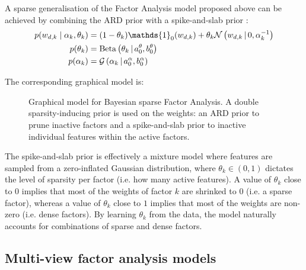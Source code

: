 A sparse generalisation of the Factor Analysis model proposed above can be achieved by combining the ARD prior with a spike-and-slab prior \cite{Mitchell1988,Titsias2011}:
\begin{align}
	p(w_{d,k} \mid \alpha_k,\theta_k) &= (1-\theta_k) \mathds{1}_0(w_{d,k}) + \theta_k \Ndist{w_{d,k}}{0, \alpha_k^{-1}} \\
	p(\theta_k) &= \Bdist{\theta_k}{a_0^\theta,b_0^\theta} \\
	p(\alpha_k) &= \Gdist{\alpha_k}{a_0^\alpha, b_0^\alpha}
\end{align}

The corresponding graphical model is:

\begin{figure}[H] \begin{center}
	
	\label{fig:bayesianFA}
	\caption{Graphical model for Bayesian sparse Factor Analysis. A double sparsity-inducing prior is used on the weights: an ARD prior to prune inactive factors and a spike-and-slab prior to inactive individual features within the active factors.}
\end{center} \end{figure}

The spike-and-slab prior is effectively a mixture model where features are sampled from a zero-inflated Gaussian distribution, where $\theta_k \in (0,1)$ dictates the level of sparsity per factor (i.e. how many active features). A value of $\theta_k$ close to $0$ implies that most of the weights of factor $k$ are shrinked to $0$ (i.e. a sparse factor), whereas a value of $\theta_k$ close to $1$ implies that most of the weights are non-zero (i.e. dense factors). By learning $\theta_k$ from the data, the model naturally accounts for combinations of sparse and dense factors.





\subsection{Multi-view factor analysis models}

